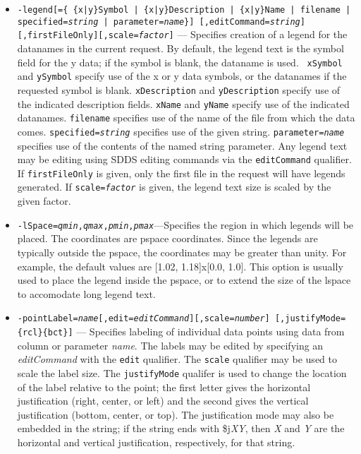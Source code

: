 \begin{itemize}
\begin{itemize}
\begin{itemize}
  \item {\tt -legend[=\{ \{x|y\}Symbol | \{x|y\}Description | \{x|y\}Name | filename | 
 specified={\em string} | parameter={\em name}\}] [,editCommand={\em string}]
  [,firstFileOnly][,scale={\em factor}]} \rm
--- Specifies creation of a legend for the datanames in the current request.  By default, the
legend text is the symbol field for the y data; if the symbol is blank, the dataname is used.  {\tt
xSymbol} and {\tt ySymbol} specify use of the x or y data symbols, or the datanames if the requested
symbol is blank.  {\tt xDescription} and {\tt yDescription} specify use of the indicated description
fields.  {\tt xName} and {\tt yName} specify use of the indicated datanames.  {\tt filename}
specifies use of the name of the file from which the data comes.  {\tt specified={\em string}}
specifies use of the given string.  {\tt parameter={\em name}} specifies use of the contents of the
named string parameter.  Any legend text may be editing using SDDS editing commands via the {\tt editCommand} qualifier.  If {\tt firstFileOnly} is given, only the first file
in the request will have legends generated.  If {\tt scale={\em factor}} is given, the legend text
size is scaled by the given factor.

  \item {\tt -lSpace={\em qmin},{\em qmax},{\em pmin},{\em pmax}}---Specifies the region in which
legends will be placed.  The coordinates are pspace coordinates.  Since the legends are typically
outside the pspace, the coordinates may be greater than unity.  For example, the default values are
[1.02, 1.18]x[0.0, 1.0].  This option is usually used to place the legend inside the pspace, or to
extend the size of the lspace to accomodate long legend text.

  \item {\tt -pointLabel={\em name}[,edit={\em editCommand}][,scale={\em number}]
        [,justifyMode=\{rcl\}\{bct\}]} --- Specifies labeling of individual data points using
        data from column or parameter {\em name}.  The labels may be edited by specifying an
        {\em editCommand} with the {\tt edit} qualifier.  The {\tt scale} qualifier may be
        used to scale the label size.  The {\tt justifyMode} qualifer is used to change the
        location of the label relative to the point; the first letter gives the horizontal
        justification (right, center, or left) and the second gives the vertical
        justification (bottom, center, or top). The justification mode may also be embedded  in
        the string; if the string ends with \$j{\em XY}, then {\em X} and {\em Y} are the
        horizontal and vertical justification, respectively, for that string.
        

\end{itemize}
\end{itemize}
\end{itemize}
